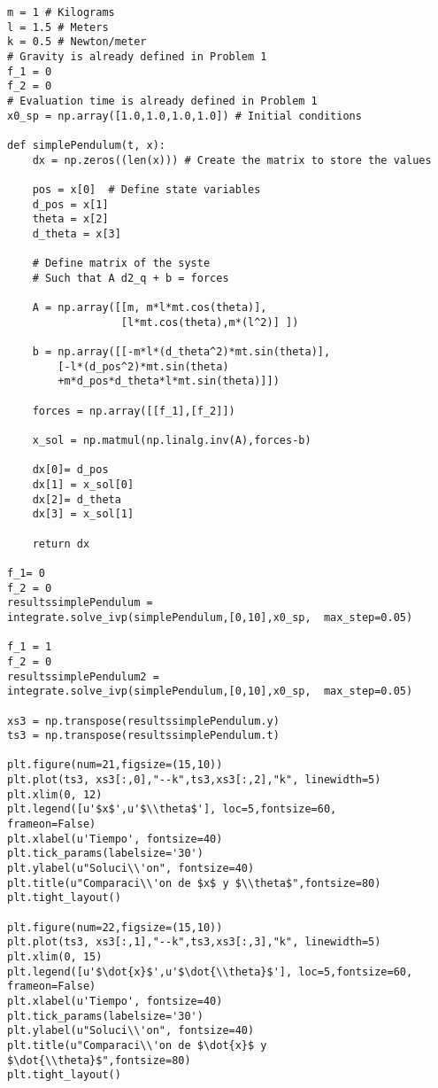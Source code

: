 \documentclass[12pt,letterpaper]{article}
\begin{document}
\begin{verbatim}
m = 1 # Kilograms
l = 1.5 # Meters
k = 0.5 # Newton/meter
# Gravity is already defined in Problem 1
f_1 = 0 
f_2 = 0 
# Evaluation time is already defined in Problem 1
x0_sp = np.array([1.0,1.0,1.0,1.0]) # Initial conditions

def simplePendulum(t, x):
    dx = np.zeros((len(x))) # Create the matrix to store the values
        
    pos = x[0]  # Define state variables
    d_pos = x[1]
    theta = x[2]
    d_theta = x[3]

    # Define matrix of the syste
    # Such that A d2_q + b = forces
    
    A = np.array([[m, m*l*mt.cos(theta)],
                  [l*mt.cos(theta),m*(l^2)] ])

    b = np.array([[-m*l*(d_theta^2)*mt.sin(theta)],
        [-l*(d_pos^2)*mt.sin(theta)
        +m*d_pos*d_theta*l*mt.sin(theta)]])
    
    forces = np.array([[f_1],[f_2]])
    
    x_sol = np.matmul(np.linalg.inv(A),forces-b)
    
    dx[0]= d_pos
    dx[1] = x_sol[0]
    dx[2]= d_theta
    dx[3] = x_sol[1]
    
    return dx
    
f_1= 0
f_2 = 0
resultssimplePendulum = 
integrate.solve_ivp(simplePendulum,[0,10],x0_sp,  max_step=0.05)

f_1 = 1
f_2 = 0
resultssimplePendulum2 =
integrate.solve_ivp(simplePendulum,[0,10],x0_sp,  max_step=0.05)

xs3 = np.transpose(resultssimplePendulum.y)
ts3 = np.transpose(resultssimplePendulum.t)

plt.figure(num=21,figsize=(15,10))
plt.plot(ts3, xs3[:,0],"--k",ts3,xs3[:,2],"k", linewidth=5)
plt.xlim(0, 12)
plt.legend([u'$x$',u'$\\theta$'], loc=5,fontsize=60,
frameon=False)
plt.xlabel(u'Tiempo', fontsize=40)
plt.tick_params(labelsize='30')
plt.ylabel(u"Soluci\\'on", fontsize=40)
plt.title(u"Comparaci\\'on de $x$ y $\\theta$",fontsize=80)
plt.tight_layout()

plt.figure(num=22,figsize=(15,10))
plt.plot(ts3, xs3[:,1],"--k",ts3,xs3[:,3],"k", linewidth=5)
plt.xlim(0, 15)
plt.legend([u'$\dot{x}$',u'$\dot{\\theta}$'], loc=5,fontsize=60,
frameon=False)
plt.xlabel(u'Tiempo', fontsize=40)
plt.tick_params(labelsize='30')
plt.ylabel(u"Soluci\\'on", fontsize=40)
plt.title(u"Comparaci\\'on de $\dot{x}$ y $\dot{\\theta}$",fontsize=80)
plt.tight_layout()
    

\end{verbatim}
\end{document}
